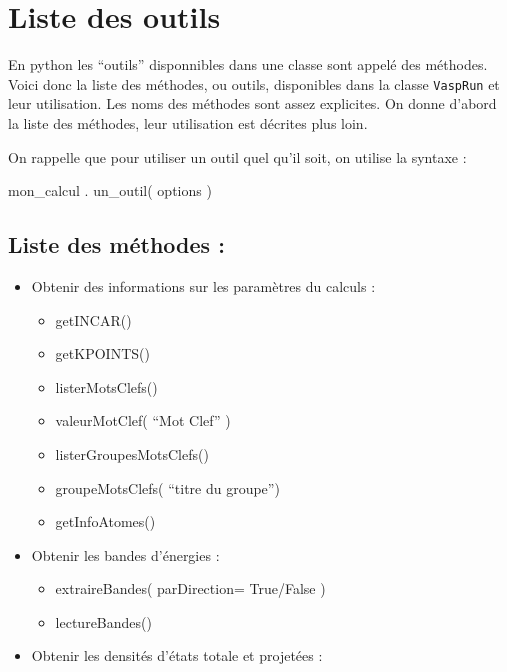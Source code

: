 \documentclass[10pt,a4paper,fleqn]{article}
\begin{document}
\section{Liste des outils}

En python les ``outils'' disponnibles dans une classe sont appelé des méthodes. Voici donc la liste
des méthodes, ou outils, disponibles dans la classe \verb!VaspRun! et leur utilisation. Les noms des
méthodes sont assez explicites. On donne d'abord la liste des méthodes, leur utilisation est
décrites plus loin.

On rappelle que pour utiliser un outil quel qu'il soit, on utilise la syntaxe :

\begin{console}
	mon_calcul . un_outil( options )
\end{console}

\subsection{Liste des méthodes :}

\begin{itemize}
	\item Obtenir des informations sur les paramètres du calculs :
		\begin{itemize}
			\item getINCAR()
			\item getKPOINTS()
			\item listerMotsClefs()
			\item valeurMotClef( ``Mot Clef'' )
			\item listerGroupesMotsClefs()
			\item groupeMotsClefs( ``titre du groupe'')
			\item getInfoAtomes() \\
		\end{itemize}

	\item Obtenir les bandes d’énergies :
		\begin{itemize}
			\item extraireBandes( parDirection= True/False )
			\item lectureBandes() \\
		\end{itemize}

	\item Obtenir les densités d’états totale et projetées :
\end{itemize}
\end{document}
